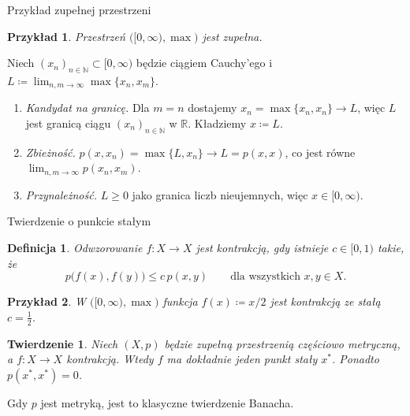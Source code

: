 \documentclass{beamer}
\newtheorem*{definicja}{Definicja}
\newtheorem*{twierdzenie}{Twierdzenie}
\newtheorem*{przyklad}{Przykład}
\newcommand{\N}{\mathbb{N}}
\newcommand{\R}{\mathbb{R}}
\begin{document}
\begin{frame}{Przykład zupełnej przestrzeni}
  \begin{przyklad}
    Przestrzeń $\bigl([0,\infty),\max\bigr)$ jest zupełna.
  \end{przyklad}

  Niech $(x_n)_{n\in\N}\subset[0,\infty)$ będzie ciągiem Cauchy'ego i
  $L\coloneqq\lim_{n,m\to\infty}\max\{x_n,x_m\}$.

  \begin{enumerate}
    \item \emph{Kandydat na granicę.} Dla $m=n$ dostajemy
          $x_n=\max\{x_n,x_n\}\to L$, więc $L$ jest granicą ciągu $(x_n)_{n\in\N}$ w $\R$.
          Kładziemy $x\coloneqq L$.
    \item \emph{Zbieżność.} $p(x,x_n)=\max\{L,x_n\}\to L=p(x,x)$, co jest równe
          $\lim_{n,m\to\infty}p(x_n,x_m)$.
    \item \emph{Przynależność.} $L\ge 0$ jako granica liczb nieujemnych,
          więc $x\in[0,\infty)$.
  \end{enumerate}
\end{frame}

\begin{frame}{Twierdzenie o punkcie stałym}
  \begin{definicja}
    Odwzorowanie $f\colon X\to X$ jest \emph{kontrakcją}, gdy istnieje
    $c\in[0,1)$ takie, że
    \[
      p\bigl(f(x),f(y)\bigr)\le c\,p(x,y)\qquad\text{dla wszystkich } x,y\in X.
    \]
  \end{definicja}

  \begin{przyklad}
    W $\bigl([0,\infty),\max\bigr)$ funkcja $f(x)\coloneqq x/2$ jest kontrakcją ze
    stałą $c=\tfrac12$.
  \end{przyklad}

  \begin{twierdzenie}
    Niech $(X,p)$ będzie zupełną przestrzenią częściowo metryczną, a
    $f\colon X\to X$ kontrakcją. Wtedy $f$ ma dokładnie jeden punkt stały $x^*$.
    Ponadto $p(x^*,x^*)=0$.
  \end{twierdzenie}

  \medskip
  Gdy $p$ jest metryką, jest to klasyczne twierdzenie Banacha.
\end{frame}
\end{document}
